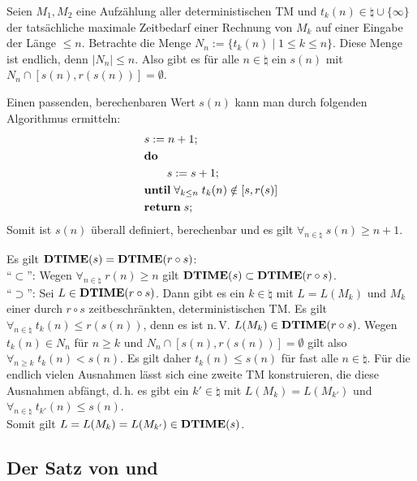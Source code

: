 \begin{Beweis}
    Seien $M_1, M_2$ eine Aufzählung aller deterministischen TM und
    $t_k(n) \in \natural \cup \{\infty\}$ der tatsächliche maximale Zeitbedarf einer Rechnung
    von $M_k$ auf einer Eingabe der Länge $\le n$.
    Betrachte die Menge $N_n := \{t_k(n) \;|\; 1 \le k \le n\}$.
    Diese Menge ist endlich, denn $|N_n| \le n$.
    Also gibt es für alle $n \in \natural$ ein $s(n)$ mit
    $N_n \cap [s(n), r(s(n))] = \emptyset$.

    Einen passenden, berechenbaren Wert $s(n)$ kann man durch folgenden Algorithmus ermitteln:
    \begin{align*}&
        s := n + 1;\\&
        \mathbf{do}\;\\&
        \qquad s := s + 1;\\&
        \mathbf{until}\; \forall_{k \le n}\; t_k(n) \notin [s, r(s)]\\&
        \mathbf{return}\; s;
    \end{align*}
    Somit ist $s(n)$ überall definiert, berechenbar und es gilt
    $\forall_{n \in \natural}\; s(n) \ge n + 1$.

    Es gilt $\mathbf{DTIME}(s) = \mathbf{DTIME}(r \circ s)$:\\
    "`$\subset$"':
    Wegen $\forall_{n \in \natural}\; r(n) \ge n$ gilt $\mathbf{DTIME}(s) \subset \mathbf{DTIME}(r \circ s)$.\\
    "`$\supset$"':
    Sei $L \in \mathbf{DTIME}(r \circ s)$.
    Dann gibt es ein $k \in \natural$ mit $L = L(M_k)$ und $M_k$ einer durch $r \circ s$
    zeitbeschränkten, deterministischen TM.
    Es gilt $\forall_{n \in \natural}\; t_k(n) \le r(s(n))$, denn es ist n.\,V.
    $L(M_k) \in \mathbf{DTIME}(r \circ s)$.
    Wegen $t_k(n) \in N_n$ für $n \ge k$ und $N_n \cap [s(n), r(s(n))] = \emptyset$ gilt
    also $\forall_{n \ge k}\; t_k(n) < s(n)$.
    Es gilt daher $t_k(n) \le s(n)$ für fast alle $n \in \natural$.
    Für die endlich vielen Ausnahmen lässt sich eine zweite TM konstruieren, die diese
    Ausnahmen abfängt, d.\,h. es gibt ein $k' \in \natural$ mit $L(M_k) = L(M_{k'})$ und
    $\forall_{n \in \natural}\; t_{k'}(n) \le s(n)$.\\
    Somit gilt $L = L(M_k) = L(M_{k'}) \in \mathbf{DTIME}(s)$.
\end{Beweis}

\subsection{%
    Der Satz von  und %
}

